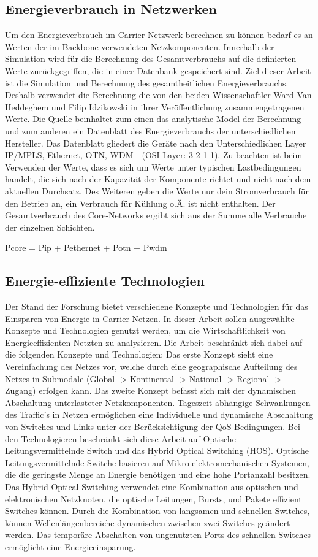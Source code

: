\documentclass[12pt,titlepage]{article}
\begin{document}
\subsection{Energieverbrauch in Netzwerken}
Um den Energieverbrauch im Carrier-Netzwerk berechnen zu können bedarf es an Werten der im Backbone verwendeten Netzkomponenten. Innerhalb der Simulation wird für die Berechnung des Gesamtverbrauchs auf die definierten Werte zurückgegriffen, die in einer Datenbank gespeichert sind. Ziel dieser Arbeit ist die Simulation und Berechnung des gesamtheitlichen Energieverbrauchs. Deshalb verwendet die Berechnung die von den beiden Wissenschaftler Ward Van Heddeghem und Filip Idzikowski in ihrer Veröffentlichung zusammengetragenen Werte. Die Quelle beinhaltet zum einen das analytische Model der Berechnung und zum anderen ein Datenblatt des Energieverbrauchs der unterschiedlichen Hersteller. Das Datenblatt gliedert die Geräte nach den Unterschiedlichen Layer IP/MPLS, Ethernet, OTN, WDM - (OSI-Layer: 3-2-1-1). Zu beachten ist beim Verwenden der Werte, dass es sich um Werte unter typischen Lastbedingungen handelt, die sich nach der Kapazität der Komponente richtet und nicht nach dem aktuellen Durchsatz. Des Weiteren geben die Werte nur dein Stromverbrauch für den Betrieb an, ein Verbrauch für Kühlung o.Ä. ist nicht enthalten.
Der Gesamtverbrauch des Core-Networks ergibt sich aus der Summe alle Verbrauche der einzelnen Schichten. 

Pcore = Pip + Pethernet + Potn + Pwdm


\subsection{Energie-effiziente Technologien}
Der Stand der Forschung bietet verschiedene Konzepte und Technologien für das Einsparen von Energie in Carrier-Netzen. In dieser Arbeit sollen ausgewählte Konzepte und Technologien genutzt werden, um die Wirtschaftlichkeit von Energieeffizienten Netzten zu analysieren. 
Die Arbeit beschränkt sich dabei auf die folgenden Konzepte und Technologien: 
Das erste Konzept sieht eine Vereinfachung des Netzes vor, welche durch eine geographische Aufteilung des Netzes in Submodale (Global -> Kontinental -> National -> Regional -> Zugang) erfolgen kann.
Das zweite Konzept befasst sich mit der dynamischen Abschaltung unterlasteter Netzkomponenten. Tageszeit abhängige Schwankungen des Traffic’s in Netzen ermöglichen eine Individuelle und dynamische Abschaltung von Switches und Links unter der Berücksichtigung der QoS-Bedingungen.  
Bei den Technologieren beschränkt sich diese Arbeit auf Optische Leitungsvermittelnde Switch und das Hybrid Optical Switching (HOS). 
Optische Leitungsvermittelnde Switche basieren auf Mikro-elektromechanischen Systemen, die die geringste Menge an Energie benötigen und eine hohe Portanzahl besitzen. Das Hybrid Optical Switching verwendet eine Kombination aus optischen und elektronischen Netzknoten, die optische Leitungen, Bursts, und Pakete effizient Switches können. Durch die Kombination von langsamen und schnellen Switches, können Wellenlängenbereiche dynamischen zwischen zwei Switches geändert werden. Das temporäre Abschalten von ungenutzten Ports des schnellen Switches ermöglicht eine Energieeinsparung. 
\end{document}

